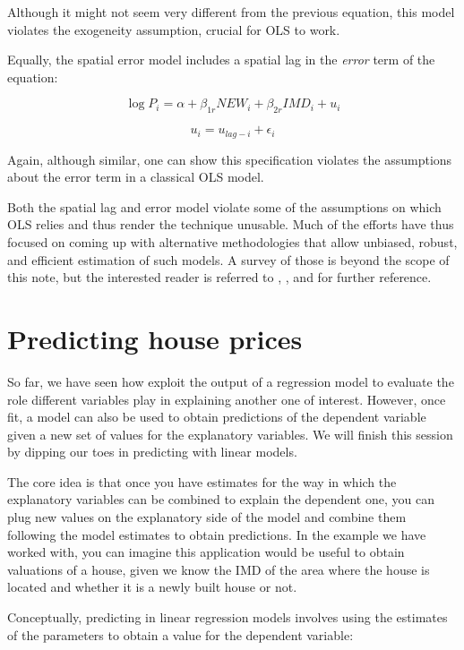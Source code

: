 \documentclass[
]{book}
\begin{document}
Although it might not seem very different from the previous equation, this model violates the exogeneity assumption, crucial for OLS to work.

Equally, the spatial error model includes a spatial lag in the \emph{error} term of the equation:

\[
\log{P_i} = \alpha + \beta_{1r} NEW_i + \beta_{2r} IMD_i + u_i
\]

\[
u_i = u_{lag-i} + \epsilon_i
\]

Again, although similar, one can show this specification violates the assumptions about the error term in a classical OLS model.

Both the spatial lag and error model violate some of the assumptions on which OLS relies and thus render the technique unusable. Much of the efforts have thus focused on coming up with alternative methodologies that allow unbiased, robust, and efficient estimation of such models. A survey of those is beyond the scope of this note, but the interested reader is referred to \citet{anselin1988spatial}, \citet{anselin2003spatial}, and \citet{anselin2014modern} for further reference.

\hypertarget{predicting-house-prices}{%
\section{Predicting house prices}\label{predicting-house-prices}}

So far, we have seen how exploit the output of a regression model to evaluate the role different variables play in explaining another one of interest. However, once fit, a model can also be used to obtain predictions of the dependent variable given a new set of values for the explanatory variables. We will finish this session by dipping our toes in predicting with linear models.

The core idea is that once you have estimates for the way in which the explanatory variables can be combined to explain the dependent one, you can plug new values on the explanatory side of the model and combine them following the model estimates to obtain predictions. In the example we have worked with, you can imagine this application would be useful to obtain valuations of a house, given we know the IMD of the area where the house is located and whether it is a newly built house or not.

Conceptually, predicting in linear regression models involves using the estimates of the parameters to obtain a value for the dependent variable:
\end{document}
